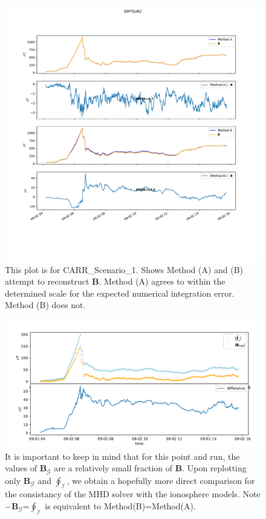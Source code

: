 \documentclass{article}
\newcommand\B{\mathbf{B}}
\newcommand\G{\mathcal{G}}
\newcommand\I{\mathcal{I}}
\begin{document}
\begin{figure}[H]
  \includegraphics[width=\textwidth]{figures/DIPTSUR2-compareAB.pdf}
  \caption{
  This plot is for CARR\_Scenario\_1.
Shows Method (A) and (B) attempt to reconstruct $\B$.
Method (A) agrees to within the determined scale for the expected numerical integration error.
Method (B) does not.
  }
  \label{CARRcompareAB}
\end{figure}

\begin{figure}[H] 
  \includegraphics[width=\textwidth]{test_iono_GMpoint1.pdf}
  \caption{
It is important to keep in mind that for this point and run,
the values of $\B_{\G}$ are a relatively small fraction of $\B$.
Upon replotting only $\B_{\G}$ and $\oint_{\I}$,
we obtain a hopefully more direct comparison for the consistancy of the MHD solver with the ionosphere models.
Note $-\B_{\G}$=$\oint_{\I}$ is equivalent to Method(B)=Method(A).
  }
  \label{CARR_conscheck}
\end{figure}
\end{document}
